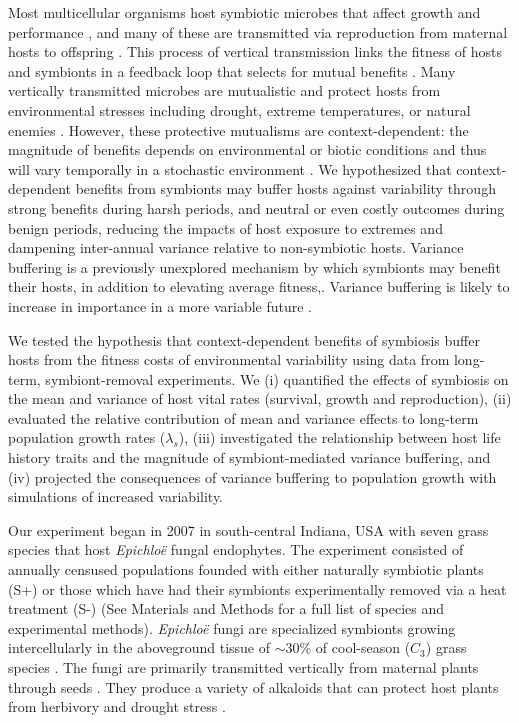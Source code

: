 \documentclass[12pt]{article}
\begin{document}
Most multicellular organisms host symbiotic microbes that affect growth and performance \cite{rodriguez2009fungal,mcfall2013animals}, and many of these are transmitted via reproduction from maternal hosts to offspring \cite{funkhouser2013mom}.
This process of vertical transmission links the fitness of hosts and symbionts in a feedback loop that selects for mutual benefits \cite{ewald1987transmission,fine1975vectors}.
Many vertically transmitted microbes are mutualistic and protect hosts from environmental stresses including drought, extreme temperatures, or natural enemies \cite{russell2006costs,brownlie2009symbiont,kivlin2013fungal,corbin2017heritable,hoadley2019host}. 
However, these protective mutualisms are context-dependent: the magnitude of benefits depends on environmental or biotic conditions \cite{chamberlain2014context} and thus will vary temporally in a stochastic environment \cite{jordano1994spatial,billick2003relative}.
We hypothesized that context-dependent benefits from symbionts may buffer hosts against variability through strong benefits during harsh periods, and neutral or even costly outcomes during benign periods, reducing the impacts of host exposure to extremes and dampening inter-annual variance relative to non-symbiotic hosts.
Variance buffering is a previously unexplored mechanism by which symbionts may benefit their hosts, in addition to elevating average fitness,. Variance buffering is likely to increase in importance in a more variable future \cite{rudgers2020climate}.

We tested the hypothesis that context-dependent benefits of symbiosis buffer hosts from the fitness costs of environmental variability using data from long-term, symbiont-removal experiments. 
We  (i) quantified the effects of symbiosis on the mean and variance of host vital rates (survival, growth and reproduction), (ii) evaluated the relative contribution of mean and variance effects to long-term population growth rates ($\lambda_s$), (iii) investigated the relationship between host life history traits and the magnitude of symbiont-mediated variance buffering, and (iv) projected the consequences of variance buffering to population growth with simulations of increased variability.

Our experiment began in 2007 in south-central Indiana, USA with seven grass species that host \emph{Epichlo\"{e}} fungal endophytes. The experiment consisted of annually censused populations founded with either naturally symbiotic plants (S+) or those which have had their symbionts experimentally removed  via a heat treatment (S-) (See Materials and Methods for a full list of species and experimental methods).
\emph{Epichlo\"{e}} fungi are specialized symbionts growing intercellularly in the aboveground tissue of  $\sim30$\% of cool-season ($C_{3}$) grass species \cite{leuchtmann1992systematics}.
The fungi are primarily transmitted vertically from maternal plants through seeds \cite{cheplick2009ecology,rudgers2009fungus}.
They produce a variety of alkaloids that can protect host plants from herbivory \cite{brem2001epichloe} and drought stress \cite{cheplick2004recovery,kannadan2008endophyte,decunta2021systematic}.
\end{document}
